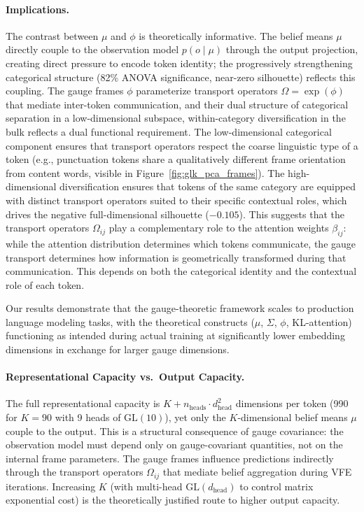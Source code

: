 \documentclass[twoside,11pt]{article}
\begin{document}
\paragraph{Implications.} The contrast between $\mu$ and $\phi$ is theoretically informative. The belief means $\mu$ directly couple to the observation model $p(o \mid \mu)$ through the output projection, creating direct pressure to encode token identity; the progressively strengthening categorical structure (82\% ANOVA significance, near-zero silhouette) reflects this coupling. The gauge frames $\phi$ parameterize transport operators $\Omega = \exp(\phi)$ that mediate inter-token communication, and their dual structure of categorical separation in a low-dimensional subspace, within-category diversification in the bulk reflects a dual functional requirement. The low-dimensional categorical component ensures that transport operators respect the coarse linguistic type of a token (e.g., punctuation tokens share a qualitatively different frame orientation from content words, visible in Figure~\ref{fig:glk_pca_frames}). The high-dimensional diversification ensures that tokens of the same category are equipped with distinct transport operators suited to their specific contextual roles, which drives the negative full-dimensional silhouette ($-0.105$). This suggests that the transport operators $\Omega_{ij}$ play a complementary role to the attention weights $\beta_{ij}$: while the attention distribution determines which tokens communicate, the gauge transport determines how information is geometrically transformed during that communication. This depends on both the categorical identity and the contextual role of each token.

Our results demonstrate that the gauge-theoretic framework scales to production language modeling tasks, with the theoretical constructs ($\mu$, $\Sigma$, $\phi$, KL-attention) functioning as intended during actual training at significantly lower embedding dimensions in exchange for larger gauge dimensions.

\paragraph{Representational Capacity vs.\ Output Capacity.}
The full representational capacity is $K + n_{\mathrm{heads}} \cdot d_{\mathrm{head}}^2$ dimensions per token (990 for $K=90$ with 9 heads of $\mathrm{GL}(10)$), yet only the $K$-dimensional belief means $\mu$ couple to the output. This is a structural consequence of gauge covariance: the observation model must depend only on gauge-covariant quantities, not on the internal frame parameters. The gauge frames influence predictions indirectly through the transport operators $\Omega_{ij}$ that mediate belief aggregation during VFE iterations. Increasing $K$ (with multi-head $\mathrm{GL}(d_{\text{head}})$ to control matrix exponential cost) is the theoretically justified route to higher output capacity.
\end{document}
